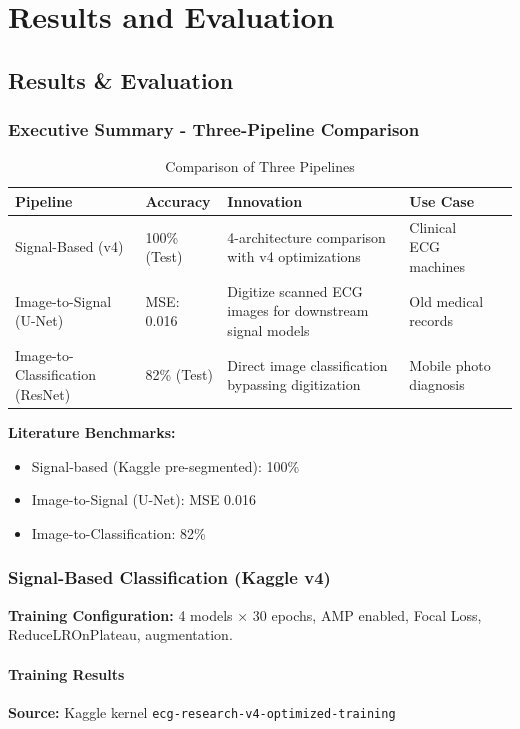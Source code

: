 \part{Results and Evaluation}

\chapter{Results \& Evaluation}
\label{chap:results}

\section{Executive Summary - Three-Pipeline Comparison}

\begin{table}[H]
\centering
\caption{Comparison of Three Pipelines}
\label{tab:pipelines}
\begin{tabular}{|l|l|l|l|l|}
\hline
\textbf{Pipeline} & \textbf{Accuracy} & \textbf{Innovation} & \textbf{Use Case} \\
\hline
Signal-Based (v4) & 100\% (Test) & 4-architecture comparison with v4 optimizations & Clinical ECG machines \\
\hline
Image-to-Signal (U-Net) & MSE: 0.016 & Digitize scanned ECG images for downstream signal models & Old medical records \\
\hline
Image-to-Classification (ResNet) & 82\% (Test) & Direct image classification bypassing digitization & Mobile photo diagnosis \\
\hline
\end{tabular}
\end{table}

\textbf{Literature Benchmarks:}
\begin{itemize}
    \item Signal-based (Kaggle pre-segmented): 100\%
    \item Image-to-Signal (U-Net): MSE 0.016
    \item Image-to-Classification: 82\%
\end{itemize}

\section{Signal-Based Classification (Kaggle v4)}
\textbf{Training Configuration:} 4 models × 30 epochs, AMP enabled, Focal Loss, ReduceLROnPlateau, augmentation.

\subsection{Training Results}
\textbf{Source:} Kaggle kernel \texttt{ecg-research-v4-optimized-training}

